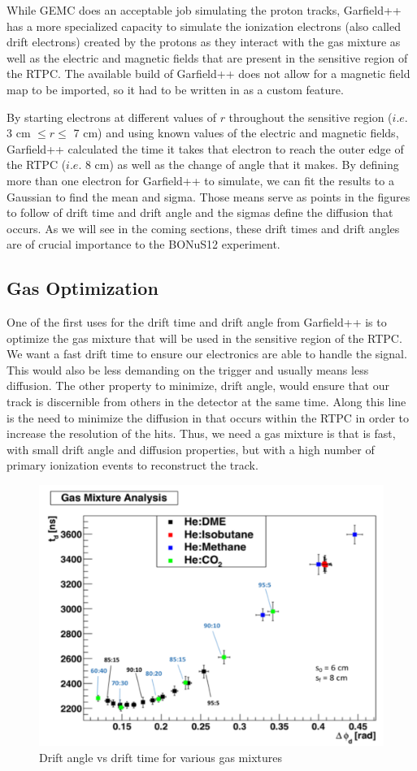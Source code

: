 While GEMC does an acceptable job simulating the proton tracks, Garfield++ has a more specialized capacity to simulate the ionization electrons (also called drift electrons) created by the protons as they interact with the gas mixture as well as the electric and magnetic fields that are present in the sensitive region of the RTPC. The available build of Garfield++ does not allow for a magnetic field map to be imported, so it had to be written in as a custom feature. 

By starting electrons at different values of $r$ throughout the sensitive region ($i.e.$ 3 cm $\leq r \leq$ 7 cm) and using known values of the electric and magnetic fields, Garfield++ calculated the time it takes that electron to reach the outer edge of the RTPC ($i.e.$ 8 cm) as well as the change of angle that it makes. By defining more than one electron for Garfield++ to simulate, we can fit the results to a Gaussian to find the mean and sigma. Those means serve as points in the figures to follow of drift time and drift angle and the sigmas define the diffusion that occurs. As we will see in the coming sections, these drift times and drift angles are of crucial importance to the BONuS12 experiment. 

\subsection{Gas Optimization}
One of the first uses for the drift time and drift angle from Garfield++ is to optimize the gas mixture that will be used in the sensitive region of the RTPC. We want a fast drift time to ensure our electronics are able to handle the signal. This would also be less demanding on the trigger and usually means less diffusion. The other property to minimize, drift angle, would ensure that our track is discernible from others in the detector at the same time. Along this line is the need to minimize the diffusion in that occurs within the RTPC in order to increase the resolution of the hits. Thus, we need a gas mixture is that is fast, with small drift angle and diffusion properties, but with a high number of primary ionization events to reconstruct the track.

\begin{figure}[h!]
	\centering
	\includegraphics[width=0.8\linewidth]{figures/gas_opt_phi_vs_t.png}
	\caption{Drift angle vs drift time for various gas mixtures}
	\label{fig:gas_opt_phi_vs_t}
\end{figure}

